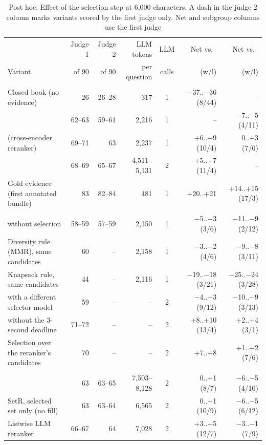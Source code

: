 \begin{table}[tp]
\caption{Post hoc. Effect of the selection step at 6,000 characters. A dash in the judge 2 column marks variants scored by the first judge only. Net and subgroup columns use the first judge}
\label{tab:ablation}
\centering
\footnotesize
\setlength{\tabcolsep}{3.5pt}
\begin{tabularx}{\textwidth}{@{}>{\raggedright\arraybackslash}Xrrrcrr@{}}
\toprule
 & Judge 1 & Judge 2 & LLM tokens & LLM & Net vs.\ & Net vs.\ \\
Variant & of 90 & of 90 & per question & calls & \hybrid{} (w/l) & \lexb{} (w/l) \\
\midrule
\multicolumn{7}{@{}l}{\emph{References}} \\
Closed book (no evidence) & 26 & 26--28 & 317 & 1 & $-$37..$-$36 (8/44) & -- \\
\hybrid{} & 62--63 & 59--61 & 2,216 & 1 & -- & $-$7..$-$5 (4/11) \\
\hr{} (cross-encoder reranker) & 69--71 & 63 & 2,237 & 1 & +6..+9 (10/4) & 0..+3 (7/6) \\
\lexb{} & 68--69 & 65--67 & 4,511--5,131 & 2 & +5..+7 (11/4) & -- \\
Gold evidence (first annotated bundle) & 83 & 82--84 & 481 & 1 & +20..+21 & +14..+15 (17/3) \\
\midrule
\multicolumn{7}{@{}l}{\emph{Selection removed or replaced}} \\
\lexb{} without selection & 58--59 & 57--59 & 2,150 & 1 & $-$5..$-$3 (3/6) & $-$11..$-$9 (2/12) \\
Diversity rule (MMR), same candidates & 60 & -- & 2,158 & 1 & $-$3..$-$2 (4/6) & $-$9..$-$8 (3/11) \\
Knapsack rule, same candidates & 44 & -- & 2,116 & 1 & $-$19..$-$18 (3/21) & $-$25..$-$24 (3/28) \\
\lexb{} with a different selector model & 59 & -- & -- & 2 & $-$4..$-$3 (9/12) & $-$10..$-$9 (3/13) \\
\lexb{} without the 3-second deadline & 71--72 & -- & -- & 2 & +8..+10 (13/4) & +2..+4 (3/1) \\
Selection over the reranker's candidates & 70 & -- & -- & 2 & +7..+8 & +1..+2 (7/6) \\
\midrule
\multicolumn{7}{@{}l}{\emph{Other selection methods}} \\
\setr{} & 63 & 63--65 & 7,503--8,128 & 2 & 0..+1 (8/7) & $-$6..$-$5 (4/10) \\
SetR, selected set only (no fill) & 63 & 63--64 & 6,565 & 2 & 0..+1 (10/9) & $-$6..$-$5 (6/12) \\
Listwise LLM reranker & 66--67 & 64 & 7,028 & 2 & +3..+5 (12/7) & $-$3..$-$1 (7/9) \\
\bottomrule
\end{tabularx}
\end{table}
